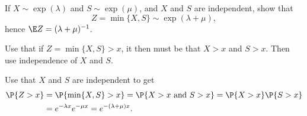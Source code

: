 

\begin{exercise}\label{ex:10}
  If $X\sim\exp(\lambda)$ and $S\sim\exp(\mu)$, and $X$ and $S$ are
  independent, show that 
  \begin{equation*}
Z=\min\{X,S\}\sim\exp(\lambda+\mu),
  \end{equation*}
hence $\E Z = (\lambda+\mu)^{-1}$.
\begin{hint}
Use that if $Z=\min\{X, S\}>x$,  it then must be that $X>x$
  and $S>x$. Then use independence of $X$ and $S$.
\end{hint}
  \begin{solution}
Use that $X$ and $S$ are independent to get
    \begin{equation*}
      \begin{split}
      \P{Z>x} 
&= \P{\min\{X,S\}>x} = \P{X>x\text{ and } S>x} = \P{X>x}\P{S>x} \\
&= e^{-\lambda x} e^{-\mu x} = e^{-(\lambda+\mu)x}.
      \end{split}
    \end{equation*}
  \end{solution}
\end{exercise}

